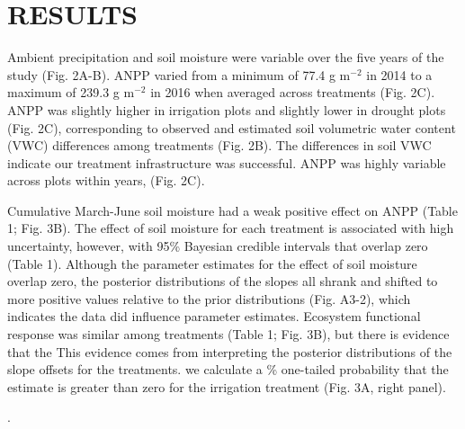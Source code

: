 \documentclass[fleqn,10pt,lineno]{wlpeerj} %
\begin{document}
\hypertarget{results}{%
\section{RESULTS}\label{results}}

Ambient precipitation and soil moisture were variable over the five
years of the study (Fig. 2A-B). ANPP varied from a minimum of 77.4 g
m\(^{-2}\) in 2014 to a maximum of 239.3 g m\(^{-2}\) in 2016 when
averaged across treatments (Fig. 2C). ANPP was slightly higher in
irrigation plots  and slightly lower in
drought plots 
(Fig. 2C), corresponding to observed and estimated soil volumetric water
content (VWC) differences among treatments (Fig. 2B).
The differences in soil VWC indicate our treatment infrastructure was
successful. ANPP was highly variable across plots within years,
(Fig. 2C).

Cumulative March-June soil moisture had a weak positive effect on ANPP
(Table 1; Fig. 3B). The effect of soil moisture for each treatment is
associated with high uncertainty, however, with 95\% Bayesian credible
intervals that  overlap zero (Table 1). Although the
parameter estimates for the effect of soil moisture overlap zero, the
posterior distributions of the slopes all shrank and shifted to more
positive values relative to the prior distributions (Fig. A3-2), which
indicates the data did influence parameter estimates. Ecosystem
functional response was similar among treatments (Table 1; Fig. 3B), but
there is evidence that the
This evidence comes from interpreting the posterior distributions of the
slope offsets for the treatments.  we
calculate a \% one-tailed probability that the estimate is
greater than zero for the irrigation treatment
(Fig. 3A, right panel).

.
\end{document}
